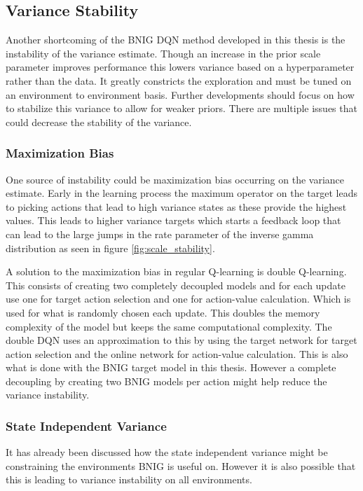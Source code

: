 \subsection{Variance Stability}

Another shortcoming of the BNIG DQN method developed in this thesis is the instability of the variance estimate. Though an increase in the prior scale parameter improves performance this lowers variance based on a hyperparameter rather than the data. It greatly constricts the exploration and must be tuned on an environment to environment basis. Further developments should focus on how to stabilize this variance to allow for weaker priors. There are multiple issues that could decrease the stability of the variance.


\subsubsection{Maximization Bias}

One source of instability could be maximization bias\citep[p.~134]{sutton_barto_2018} occurring on the variance estimate. Early in the learning process the maximum operator on the target leads to picking actions that lead to high variance states as these provide the highest values. This leads to higher variance targets which starts a feedback loop that can lead to the large jumps in the rate parameter of the inverse gamma distribution as seen in figure \ref{fig:scale_stability}.

A solution to the maximization bias in regular Q-learning is double Q-learning\citep[p.~134]{sutton_barto_2018}. This consists of creating two completely decoupled models and for each update use one for target action selection and one for action-value calculation. Which is used for what is randomly chosen each update. This doubles the memory complexity of the model but keeps the same computational complexity. The double DQN uses an approximation to this by using the target network for target action selection and the online network for action-value calculation. This is also what is done with the BNIG target model in this thesis. However a complete decoupling by creating two BNIG models per action might help reduce the variance instability.

\subsubsection{State Independent Variance}

It has already been discussed how the state independent variance might be constraining the environments BNIG is useful on. However it is also possible that this is leading to variance instability on all environments. 

